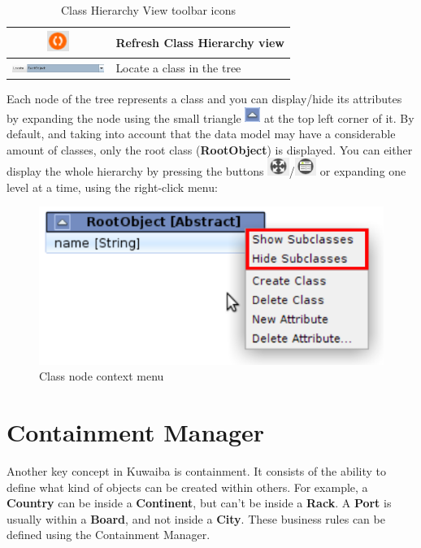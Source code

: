 \documentclass[a4paper]{article}
\begin{document}
\begin{table}[h!]
\begin{tabular}{cp{10cm}}
					\midrule
					\includegraphics[width=0.7cm]{img/icon_refresh_view.png} & Refresh Class Hierarchy view\\
					\midrule
					\includegraphics[width=3cm]{img/data_model_manager_locate.png} & Locate a class in the tree\\
				\end{tabular}
				\caption{Class Hierarchy View toolbar icons}
				\label{tab:class_hierarchy_view_icons}
			\end{table}
			
			Each node of the tree represents a class and you can display/hide its attributes by expanding the node using the small triangle \includegraphics[width=0.5cm]{img/data_model_manager_triangle.png} at the top left corner of it. By default, and taking into account that the data model may have a considerable amount of classes, only the root class (\textbf{RootObject}) is displayed. You can either display the whole hierarchy by pressing the buttons \includegraphics[width=0.7cm]{img/icon_expand_all.png}/\includegraphics[width=0.7cm]{img/icon_expand_all_with_attributes.png} or expanding one level at a time, using the right-click menu:
			\begin{figure}[h!]
				\centering
				\includegraphics[width=0.5\linewidth]{img/data_model_manager_menu.png}
				\caption{Class node context menu}
				\label{fig:class_hierarchy_context_menu}
			\end{figure}
				
	\clearpage
	\section{Containment Manager} \label{sec:containment_manager}
	Another key concept in Kuwaiba is containment. It consists of the ability to define what kind of objects can be created within others. For example, a \textbf{Country} can be inside a \textbf{Continent}, but can't be inside a \textbf{Rack}. A \textbf{Port} is usually within a \textbf{Board}, and not inside a \textbf{City}. These business rules can be defined using the Containment Manager.
	
\end{document}
